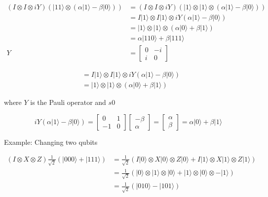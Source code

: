 \documentclass[main.tex]{subfiles}
\begin{document}
    $$
    \begin{aligned}
    (I \otimes I \otimes i Y)(|11\rangle \otimes(\alpha|1\rangle-\beta|0\rangle)) &=(I \otimes I \otimes i Y)(|1\rangle \otimes|1\rangle \otimes(\alpha|1\rangle-\beta|0\rangle)) \\
    &=I|1\rangle \otimes I|1\rangle \otimes i Y(\alpha|1\rangle-\beta|0\rangle) \\
    &=|1\rangle \otimes|1\rangle \otimes(\alpha|0\rangle+\beta|1\rangle) \\
    &=\alpha|110\rangle+\beta|111\rangle \\
    Y &=\left[\begin{array}{lc}
    0 & -i \\
    i & 0
    \end{array}\right]
    \end{aligned}
    $$
    
    $$
    \begin{aligned}
    &=I|1\rangle \otimes I|1\rangle \otimes i Y(\alpha|1\rangle-\beta|0\rangle) \\
    &=|1\rangle \otimes|1\rangle \otimes(\alpha|0\rangle+\beta|1\rangle)
    \end{aligned}
    $$
    
    where $Y$ is the Pauli operator and $s 0$
    
    $$
    i Y(\alpha|1\rangle-\beta|0\rangle)=\left[\begin{array}{cc}
    0 & 1 \\
    -1 & 0
    \end{array}\right]\left[\begin{array}{c}
    -\beta \\
    \alpha
    \end{array}\right]=\left[\begin{array}{c}
    \alpha \\
    \beta
    \end{array}\right]=\alpha|0\rangle+\beta|1\rangle
    $$
    
    Example: Changing two qubits
    
    $$
    \begin{aligned}
    (I \otimes X \otimes Z) \frac{1}{\sqrt{2}}(|000\rangle+|111\rangle) &=\frac{1}{\sqrt{2}}(I|0\rangle \otimes X|0\rangle \otimes Z|0\rangle+I|1\rangle \otimes X|1\rangle \otimes Z|1\rangle) \\
    &=\frac{1}{\sqrt{2}}(|0\rangle \otimes|1\rangle \otimes|0\rangle+|1\rangle \otimes|0\rangle \otimes-|1\rangle) \\
    &=\frac{1}{\sqrt{2}}(|010\rangle-|101\rangle)
    \end{aligned}
    $$
    
\end{document}
